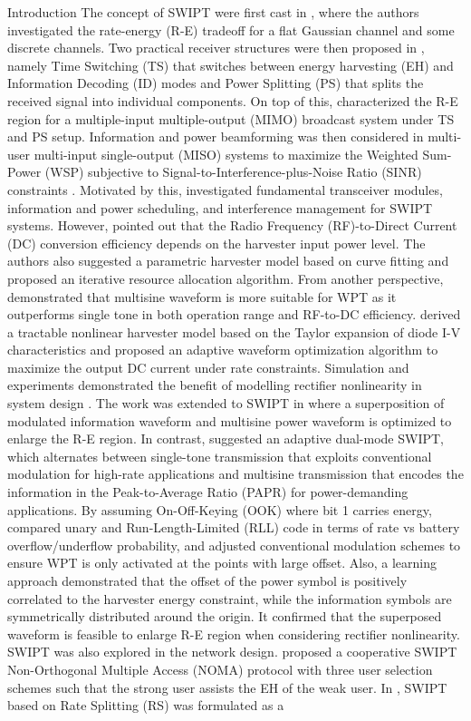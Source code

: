 \documentclass{IEEEtran}
\begin{document}
\begin{section}{Introduction}
	The concept of SWIPT were first cast in \cite{Varshney2008}, where the authors investigated the rate-energy (R-E) tradeoff for a flat Gaussian channel and some discrete channels. Two practical receiver structures were then proposed in \cite{Zhou2013}, namely Time Switching (TS) that switches between energy harvesting (EH) and Information Decoding (ID) modes and Power Splitting (PS) that splits the received signal into individual components. On top of this, \cite{Zhang2013} characterized the R-E region for a multiple-input multiple-output (MIMO) broadcast system under TS and PS setup. Information and power beamforming was then considered in multi-user multi-input single-output (MISO) systems to maximize the Weighted Sum-Power (WSP) subjective to Signal-to-Interference-plus-Noise Ratio (SINR) constraints \cite{Xu2014}. Motivated by this, \cite{Krikidis2014} investigated fundamental transceiver modules, information and power scheduling, and interference management for SWIPT systems. However, \cite{Boshkovska2015} pointed out that the Radio Frequency (RF)-to-Direct Current (DC) conversion efficiency depends on the harvester input power level. The authors also suggested a parametric harvester model based on curve fitting and proposed an iterative resource allocation algorithm. From another perspective, \cite{Trotter2009,Boaventura2011} demonstrated that multisine waveform is more suitable for WPT as it outperforms single tone in both operation range and RF-to-DC efficiency. \cite{Clerckx2016a} derived a tractable nonlinear harvester model based on the Taylor expansion of diode I-V characteristics and proposed an adaptive waveform optimization algorithm to maximize the output DC current under rate constraints. Simulation and experiments demonstrated the benefit of modelling rectifier nonlinearity in system design \cite{Kim2019,Kim2019a}. The work was extended to SWIPT in \cite{Clerckx2018} where a superposition of modulated information waveform and multisine power waveform is optimized to enlarge the R-E region. In contrast, \cite{Park2018} suggested an adaptive dual-mode SWIPT, which alternates between single-tone transmission that exploits conventional modulation for high-rate applications and multisine transmission that encodes the information in the Peak-to-Average Ratio (PAPR) for power-demanding applications. By assuming On-Off-Keying (OOK) where bit 1 carries energy, \cite{Hu2019} compared unary and Run-Length-Limited (RLL) code in terms of rate vs battery overflow/underflow probability, and adjusted conventional modulation schemes to ensure WPT is only activated at the points with large offset. Also, a learning approach \cite{Varasteh2019c} demonstrated that the offset of the power symbol is positively correlated to the harvester energy constraint, while the information symbols are symmetrically distributed around the origin. It confirmed that the superposed waveform is feasible to enlarge R-E region when considering rectifier nonlinearity. SWIPT was also explored in the network design. \cite{Liu2016} proposed a cooperative SWIPT Non-Orthogonal Multiple Access (NOMA) protocol with three user selection schemes such that the strong user assists the EH of the weak user. In \cite{Mao2019}, SWIPT based on Rate Splitting (RS) was formulated as a 
\end{section}
\end{document}

